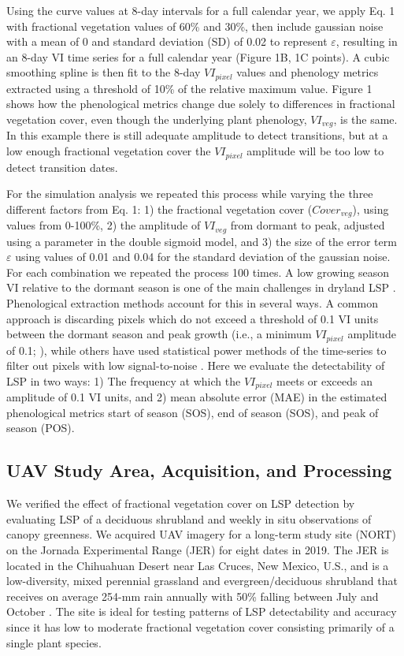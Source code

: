 \documentclass{article}
\begin{document}
Using the curve values at 8-day intervals for a full calendar year, we apply Eq. 1 with fractional vegetation values of 60\% and 30\%, then include gaussian noise with a mean of 0 and standard deviation (SD) of 0.02 to represent $\varepsilon$, resulting in an 8-day VI time series for a full calendar year (Figure 1B, 1C points). A cubic smoothing spline is then fit to the 8-day $VI_{pixel}$ values and phenology metrics extracted using a threshold of 10\% of the relative maximum value. Figure 1 shows how the phenological metrics change due solely to differences in fractional vegetation cover, even though the underlying plant phenology, $VI_{veg}$, is the same. In this example there is still adequate amplitude to detect transitions, but at a low enough fractional vegetation cover the $VI_{pixel}$ amplitude will be too low to detect transition dates.

For the simulation analysis we repeated this process while varying the three different factors from Eq. 1: 1) the fractional vegetation cover ($Cover_{veg}$), using values from 0-100\%, 2) the amplitude of $VI_{veg}$ from dormant to peak, adjusted using a parameter in the double sigmoid model, and 3) the size of the error term $\varepsilon$ using values of 0.01 and 0.04 for the standard deviation of the gaussian noise. For each combination we repeated the process 100 times. A low growing season VI relative to the dormant season is one of the main challenges in dryland LSP \cite{smith2019}. Phenological extraction methods account for this in several ways. A common approach is discarding pixels which do not exceed a threshold of 0.1 VI units between the dormant season and peak growth (i.e., a minimum $VI_{pixel}$ amplitude of 0.1; \cite{white2009, jeong2011, garonna2016, gray2019}), while others have used statistical power methods of the time-series to filter out pixels with low signal-to-noise \cite{dannenberg2017}. Here we evaluate the detectability of LSP in two ways: 1) The frequency at which the $VI_{pixel}$ meets or exceeds an amplitude of 0.1 VI units, and 2) mean absolute error (MAE) in the estimated phenological metrics start of season (SOS), end of season (SOS), and peak of season (POS). 

\subsection{UAV Study Area, Acquisition, and Processing}

We verified the effect of fractional vegetation cover on LSP detection by evaluating LSP of a deciduous shrubland and weekly in situ observations of canopy greenness. We acquired UAV imagery for a long-term study site (NORT) on the Jornada Experimental Range (JER) for eight dates in 2019. The JER is located in the Chihuahuan Desert near Las Cruces, New Mexico, U.S., and is a low-diversity, mixed perennial grassland and evergreen/deciduous shrubland that receives on average 254-mm rain annually with 50\% falling between July and October \cite{browning2015}. The site is ideal for testing patterns of LSP detectability and accuracy since it has low to moderate fractional vegetation cover consisting primarily of a single plant species.
\end{document}
